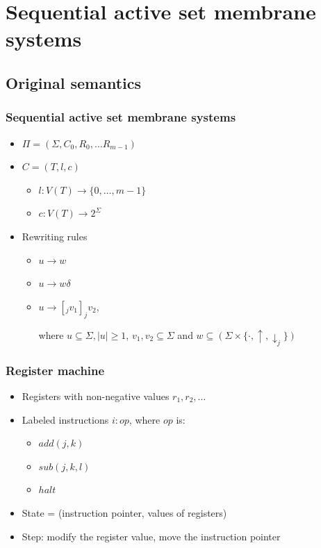

\section{Sequential active set membrane systems} %
\label{sec:sequential_active_set_membrane_systems}

  \subsection{Original semantics} %
  \label{sub:original_semantics}

    \begin{frame}[t]\frametitle{Sequential active set membrane systems}
      \begin{itemize}
        \item $\Pi = (\Sigma, C_0, R_0, \ldots R_{m-1})$
        \pause
        \item $C = (T, l, c)$
        \begin{itemize}
          \item $l: V(T) \rightarrow \{0, \ldots, m-1\}$
          \item $c: V(T) \rightarrow 2^\Sigma$
        \end{itemize}
        \pause
        \item Rewriting rules
        \begin{itemize}
          \item $u\rightarrow w$
          \item $u\rightarrow w\delta$
          \item $u\rightarrow [_j v_1]_j v_2$,

          where $u \subseteq \Sigma, |u|\geq 1$, $v_1,v_2\subseteq\Sigma$ and $w\subseteq (\Sigma\times\{\cdot, \uparrow, \downarrow_{j}\})$
        \end{itemize}

      \end{itemize}
    \end{frame}
    \note{}

    \begin{frame}[t]\frametitle{Register machine}
      \begin{itemize}
        \item Registers with non-negative values $r_1, r_2, \ldots$
        \item Labeled instructions $i: op$, where $op$ is:
        \begin{itemize}
          \item $add(j, k)$
          \item $sub(j, k, l)$
          \item $halt$
        \end{itemize}
        \item State = (instruction pointer, values of registers)
        \item Step: modify the register value, move the instruction pointer
      \end{itemize}
    \end{frame}

